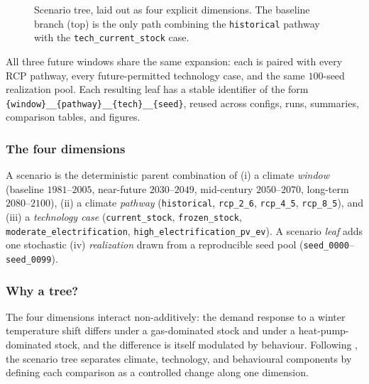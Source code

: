 \begin{figure}[ht]
{}
  \caption{Scenario tree, laid out as four explicit dimensions. The
  baseline branch (top) is the only path combining the
  \texttt{historical} pathway with the \texttt{tech\_current\_stock}
  case.}
  \label{fig:scenario_tree}
\end{figure}

All three future windows share the same expansion: each is paired with every RCP pathway, every future-permitted technology case, and the same $100$-seed realization pool. Each resulting leaf has a stable identifier of the form \texttt{\{window\}\_\_\{pathway\}\_\_\{tech\}\_\_\{seed\}}, reused across configs, runs, summaries, comparison tables, and figures.

\subsubsection*{The four dimensions} 
A scenario is the deterministic parent combination of (i) a climate \emph{window} (baseline $1981$--$2005$, near-future $2030$--$2049$, mid-century $2050$--$2070$, long-term $2080$--$2100$), (ii) a climate \emph{pathway} (\texttt{historical}, \texttt{rcp\_2\_6}, \texttt{rcp\_4\_5}, \texttt{rcp\_8\_5}), and (iii) a \emph{technology case} (\texttt{current\_stock}, \texttt{frozen\_stock}, \texttt{moderate\_electrification}, \texttt{high\_electrification\_pv\_ev}). A scenario \emph{leaf} adds one stochastic (iv) \emph{realization} drawn from a reproducible seed pool (\texttt{seed\_0000}--\texttt{seed\_0099}).
 
\subsubsection*{Why a tree?} 
The four dimensions interact non-additively: the demand response to a winter temperature shift differs under a gas-dominated stock and under a heat-pump-dominated stock, and the difference is itself modulated by behaviour. Following \textcite{Hawkins2009}, the scenario tree separates climate, technology, and behavioural components by defining each comparison as a controlled change along one dimension.
 
